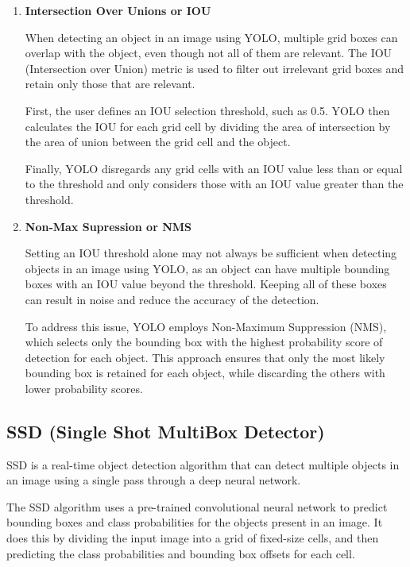 \begin{enumerate}
            \item \textbf{Intersection Over Unions or IOU}
        
            When detecting an object in an image using YOLO, multiple grid boxes can overlap with the object, even though not all of them are relevant. 
            The IOU (Intersection over Union) metric is used to filter out irrelevant grid boxes and retain only those that are relevant.
        
            First, the user defines an IOU selection threshold, such as 0.5. 
            YOLO then calculates the IOU for each grid cell by dividing the area of intersection by the area of union between the grid cell and the object.
            
            Finally, YOLO disregards any grid cells with an IOU value less than or equal to the threshold and only considers those with an IOU value greater than the threshold.
        
            \item \textbf{Non-Max Supression or NMS}
        
            Setting an IOU threshold alone may not always be sufficient when detecting objects in an image using YOLO, as an object can have multiple bounding boxes with an IOU value beyond the threshold. 
            Keeping all of these boxes can result in noise and reduce the accuracy of the detection.
        
            To address this issue, YOLO employs Non-Maximum Suppression (NMS), which selects only the bounding box with the highest probability score of detection for each object. 
            This approach ensures that only the most likely bounding box is retained for each object, while discarding the others with lower probability scores.

        \end{enumerate}

    \subsection{SSD (Single Shot MultiBox Detector)}
    SSD is a real-time object detection algorithm that can detect multiple objects in an image using a single pass through a deep neural network. 

    The SSD algorithm uses a pre-trained convolutional neural network to predict bounding boxes and class probabilities for the objects present in an image. 
    It does this by dividing the input image into a grid of fixed-size cells, and then predicting the class probabilities and bounding box offsets for each cell.
    \cite{ssdalgo:SSD-algorithm}

